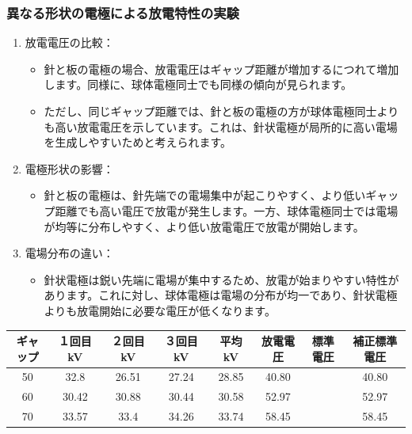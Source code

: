 \documentclass[a4paper,11pt,xelatex,ja=standard]{bxjsarticle}
\begin{document}
            \subsubsection{異なる形状の電極による放電特性の実験}
                \begin{enumerate}
                    \item 放電電圧の比較：
                    \begin{itemize}
                        \item 針と板の電極の場合、放電電圧はギャップ距離が増加するにつれて増加します。同様に、球体電極同士でも同様の傾向が見られます。
                        \item ただし、同じギャップ距離では、針と板の電極の方が球体電極同士よりも高い放電電圧を示しています。これは、針状電極が局所的に高い電場を生成しやすいためと考えられます。
                    \end{itemize}
                    \item 電極形状の影響：
                    \begin{itemize}
                        \item 針と板の電極は、針先端での電場集中が起こりやすく、より低いギャップ距離でも高い電圧で放電が発生します。一方、球体電極同士では電場が均等に分布しやすく、より低い放電電圧で放電が開始します。
                    \end{itemize}
                    \item 電場分布の違い：
                    \begin{itemize}
                        \item 針状電極は鋭い先端に電場が集中するため、放電が始まりやすい特性があります。これに対し、球体電極は電場の分布が均一であり、針状電極よりも放電開始に必要な電圧が低くなります。
                    \end{itemize}
                \end{enumerate}
                \begin{tabular}{cccccccc}
                    ギャップ & １回目 kV & ２回目 kV & ３回目 kV & 平均 kV & 放電電圧 & 標準電圧 & 補正標準電圧 \\
                    \hline
                    50 & 32.8 & 26.51 & 27.24 & 28.85 & 40.80 &  & 40.80 \\
                    60 & 30.42 & 30.88 & 30.44 & 30.58 & 52.97 &  & 52.97 \\
                    70 & 33.57 & 33.4 & 34.26 & 33.74 & 58.45 &  & 58.45 \\
                \end{tabular}
\end{document}
